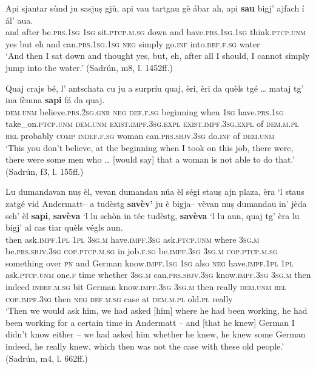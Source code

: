 \ea
\label{ex:savaj4}
\gll  Api sjantar sùnd ju sasjuṣ gjù, api vau tartgau gè ábar ah, api \textbf{sau} bigj’ ajfach í ál’ aua.\\
and after be.\textsc{prs.1sg} \textsc{1sg} sit.\textsc{ptcp.m.sg} down and have.\textsc{prs.1sg.1sg} think.\textsc{ptcp.unm} yes but eh and can.\textsc{prs.1sg.1sg} \textsc{neg} simply go.\textsc{inf} into.\textsc{def.f.sg} water\\
\glt `And then I sat down and thought yes, but, eh, after all I should, I cannot simply jump into the water.' (Sadrún, m8, l. 1452ff.)
\z                                       

\ea
\label{ex:savaj5}
\gll  Quaj crajs bé, l’ antschata cu ju a surpríu quaj, èri, èri da quèls tgé … mataj\footnotemark{} tg’ ina fèmna \textbf{sapi} fá da quaj.\\
\textsc{dem.unm} believe.\textsc{prs.2sg.gnr} \textsc{neg} \textsc{def.f.sg} beginning when \textsc{1sg} have.\textsc{prs.1sg} take\_on.\textsc{ptcp.unm} \textsc{dem.unm} \textsc{exist.impf.3sg.expl} \textsc{exist.impf.3sg.expl} of \textsc{dem.m.pl} \textsc{rel} {} probably \textsc{comp} \textsc{indef.f.sg} woman can.\textsc{prs.sbjv.3sg} do.\textsc{inf} of \textsc{dem.unm}\\
\glt `This you don’t believe, at the beginning when I took on this job, there were, there were some men who … [would say] that a woman is not able to do that.' (Sadrún, f3, l. 155ff.)
\z

\ea
\label{ex:savaj6}
\gll Lu dumandavan nuṣ èl, vevan dumandau núa èl ségi stauṣ ajn plaza, èra `l staus zatgé vid Andermatt– a tudèstg \textbf{savèv’} ju è bigja– vèvan nuṣ dumandau in' jèda sch’ èl \textbf{sapi}, \textbf{savèva} `l lu schòn in téc tudèstg, \textbf{savèva} `l lu aun, quaj tg’ èra lu bigj' al cas tiar quèls végls aun.   \\
then ask.\textsc{impf.1pl} \textsc{1pl} \textsc{3sg.m} have.\textsc{impf.3sg}  ask.\textsc{ptcp.unm} where \textsc{3sg.m} be.\textsc{prs.sbjv.3sg} \textsc{cop.ptcp.m.sg} in job.\textsc{f.sg} be.\textsc{impf.3sg} \textsc{3sg.m}  \textsc{cop.ptcp.m.sg} something over \textsc{pn} and German know.\textsc{impf.1sg} \textsc{1sg} also \textsc{neg} have.\textsc{impf.1pl} \textsc{1pl} ask.\textsc{ptcp.unm} one.\textsc{f} time whether \textsc{3sg.m} can.\textsc{prs.sbjv.3sg} know.\textsc{impf.3sg} \textsc{3sg.m} then indeed \textsc{indef.m.sg} bit German know.\textsc{impf.3sg} \textsc{3sg.m} then really \textsc{dem.unm} \textsc{rel} \textsc{cop.impf.3sg} then \textsc{neg} \textsc{def.m.sg} case at \textsc{dem.m.pl} old.\textsc{pl} really \\
\glt `Then we would ask him, we had asked [him] where he had been working, he had been working for a certain time in Andermatt – and [that he knew] German I didn't know either – we had asked him whether he knew, he knew some German indeed, he really knew, which then was not the case with these old people.' (Sadrún, m4, l. 662ff.)
\z

